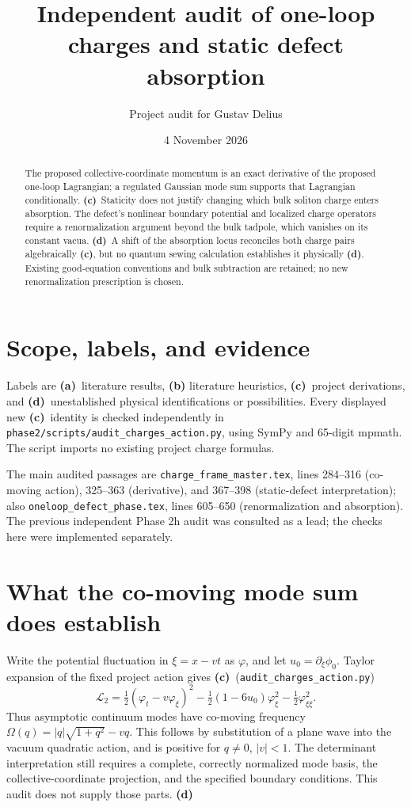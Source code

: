 \documentclass[11pt,a4paper]{article}
\title{Independent audit of one-loop charges and static defect absorption}
\author{Project audit for Gustav Delius}
\date{4 November 2026}
\newcommand{\Lc}{\textbf{(c)}}
\newcommand{\Ld}{\textbf{(d)}}
\newcommand{\La}{\textbf{(a)}}
\newcommand{\scr}{\texttt{audit\_\allowbreak charges\_\allowbreak action.py}}
\begin{document}
\maketitle
\begin{abstract}
The proposed collective-coordinate momentum is an exact derivative of the
proposed one-loop Lagrangian; a regulated Gaussian mode sum supports that
Lagrangian conditionally. \Lc\ Staticity does not justify changing which
bulk soliton charge enters absorption. The defect's nonlinear boundary
potential and localized charge operators require a renormalization argument
beyond the bulk tadpole, which vanishes on its constant vacua. \Ld\ A shift
of the absorption locus reconciles both charge pairs algebraically \Lc,
but no quantum sewing calculation establishes it physically \Ld.
Existing good-equation conventions and bulk subtraction are retained;
no new renormalization prescription is chosen.
\end{abstract}

\section{Scope, labels, and evidence}
Labels are \La\ literature results, \textbf{(b)} literature heuristics,
\Lc\ project derivations, and \Ld\ unestablished physical identifications or
possibilities. Every displayed new \Lc\ identity is checked independently in
\texttt{phase2/scripts/audit\_charges\_action.py}, using SymPy and 65-digit
mpmath. The script imports no existing project charge formulas.

The main audited passages are \texttt{charge\_frame\_master.tex}, lines
284--316 (co-moving action), 325--363 (derivative), and 367--398 (static-defect
interpretation); also \texttt{oneloop\_\allowbreak defect\_\allowbreak phase.tex}, lines 605--650
(renormalization and absorption). The previous independent Phase 2h audit was
consulted as a lead; the checks here were implemented separately.

\section{What the co-moving mode sum does establish}
Write the potential fluctuation in $\xi=x-vt$ as $\varphi$, and let
$u_0=\partial_\xi\phi_0$. Taylor expansion of the fixed project action gives
\Lc\ (\scr)
\begin{equation}
 \mathcal L_2=\tfrac12(\varphi_t-v\varphi_\xi)^2
 -\tfrac12(1-6u_0)\varphi_\xi^2-\tfrac12\varphi_{\xi\xi}^2.
 \label{eq:quadratic}
\end{equation}
Thus asymptotic continuum modes have co-moving frequency
$\Omega(q)=|q|\sqrt{1+q^2}-vq$. This follows by substitution of a plane wave
into the vacuum quadratic action, and is positive for $q\ne0$, $|v|<1$.
The determinant interpretation still requires a complete, correctly normalized
mode basis, the collective-coordinate projection, and the specified boundary
conditions. This audit does not supply those parts. \Ld
\end{document}
